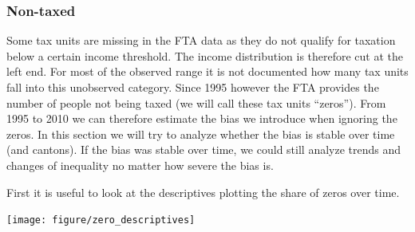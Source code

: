 \documentclass[twoside]{article}\usepackage[]{graphicx}\usepackage[]{color}
\newenvironment{knitrout}{}{} %
\begin{document}
\begin{multicols}{2}


\subsubsection{Non-taxed}
Some tax units are missing in the FTA data as they do not qualify for taxation below a certain income threshold. The income distribution is therefore cut at the left end. For most of the observed range it is not documented how many tax units fall into this unobserved category. Since 1995 however the FTA provides the number of people not being taxed (we will call these tax units ``zeros''). From 1995 to 2010 we can therefore estimate the bias we introduce when ignoring the zeros. In this section we will try to analyze whether the bias is stable over time (and cantons). If the bias was stable over time, we could still analyze trends and changes of inequality no matter how severe the bias is. 

First it is useful to look at the descriptives plotting the share of zeros over time.



\begin{knitrout}
\color{fgcolor}
\texttt{[image: figure/zero\_descriptives]} 

\end{knitrout}


\end{multicols}
\end{document}
